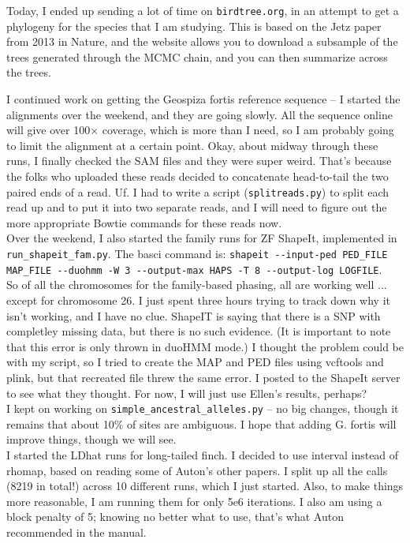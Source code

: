 \documentclass[idxtotoc,hyperref,openany,oneside]{labbook} %
\begin{document}
Today, I ended up sending a lot of time on \verb+birdtree.org+, in an attempt to get a phylogeny for the species that I am studying. This is based on the Jetz paper from 2013 in Nature, and the website allows you to download a subsample of the trees generated through the MCMC chain, and you can then summarize across the trees.

I continued work on getting the Geospiza fortis reference sequence -- I started the alignments over the weekend, and they are going slowly. All the sequence online will give over 100$\times$ coverage, which is more than I need, so I am probably going to limit the alignment at a certain point. Okay, about midway through these runs, I finally checked the SAM files and they were super weird. That's because the folks who uploaded these reads decided to concatenate head-to-tail the two paired ends of a read. Uf. I had to write a script (\verb+splitreads.py+) to split each read up and to put it into two separate reads, and I will need to figure out the more appropriate Bowtie commands for these reads now. \\

Over the weekend, I also started the family runs for ZF ShapeIt, implemented in \verb+run_shapeit_fam.py+. The basci command is: \verb+shapeit --input-ped PED_FILE MAP_FILE --duohmm -W 3 --output-max HAPS -T 8 --output-log LOGFILE+. \\

So of all the chromosomes for the family-based phasing, all are working well ... except for chromosome 26. I just spent three hours trying to track down why it isn't working, and I have no clue. ShapeIT is saying that there is a SNP with completley missing data, but there is no such evidence. (It is important to note that this error is only thrown in duoHMM mode.) I thought the problem could be with my script, so I tried to create the MAP and PED files using vcftools and plink, but that recreated file threw the same error. I posted to the ShapeIt server to see what they thought. For now, I will just use Ellen's results, perhaps? \\

I kept on working on \verb+simple_ancestral_alleles.py+ -- no big changes, though it remains that about 10\% of sites are ambiguous. I hope that adding G. fortis will improve things, though we will see. \\

I started the LDhat runs for long-tailed finch. I decided to use interval instead of rhomap, based on reading some of Auton's other papers. I split up all the calls (8219 in total!) across 10 different runs, which I just started. Also, to make things more reasonable, I am running them for only 5e6 iterations. I also am using a block penalty of 5; knowing no better what to use, that's what Auton recommended in the manual. \\
\end{document}
